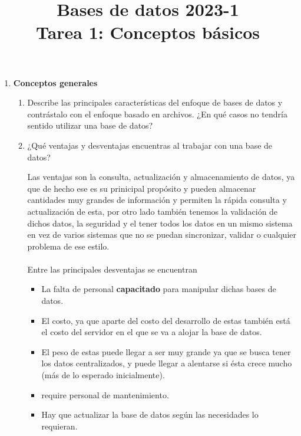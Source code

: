 \documentclass[12pt,a4paper]{article}
\title{Bases de datos 2023-1\\
Tarea 1: Conceptos básicos}
\begin{document}
\maketitle

\begin{enumerate}
	\item \textbf{Conceptos generales}
		\begin{enumerate}
			\item Describe las principales características del enfoque de bases de datos y contrástalo con el enfoque
				basado en archivos. ¿En qué casos no tendría sentido utilizar una base de datos?

			\item ¿Qué ventajas y desventajas encuentras al trabajar con una base de datos?
			
                        	Las ventajas son la consulta, actualización y almacenamiento de datos, ya que de hecho ese es su prinicipal propósito y 			        pueden almacenar cantidades muy grandes de información y permiten la rápida consulta y actualización de esta, por otro                                   lado también tenemos la validación de dichos datos, la seguridad y el tener todos los datos en un mismo sistema en vez                                   de varios sistemas que no se puedan sincronizar, validar o cualquier problema de ese estilo.\\ \\
    
    			 	Entre las principales desventajas se encuentran\\
      				\begin{itemize}
     				\item La falta de personal \textbf{capacitado} para manipular dichas bases de datos.
   			        \item El costo, ya que aparte del costo del desarrollo de estas también está el costo del servidor en el que se va a 	                                 alojar la base de datos.
    				\item El peso de estas puede llegar a ser muy grande ya que se busca tener los datos centralizados, y puede llegar a                                     alentarse si ésta crece mucho (más de lo esperado inicialmente).
   			        \item require personal de mantenimiento.
                                \item Hay que actualizar la base de datos según las necesidades lo requieran.
                                \end{itemize}				
				

\end{enumerate}
\end{enumerate}
\end{document}
